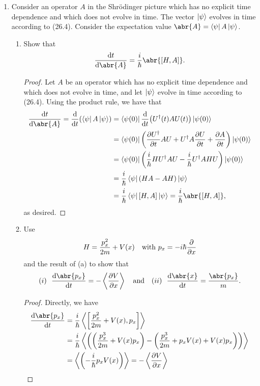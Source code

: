 \documentclass[11pt]{article}
\newcommand{\br}[1]{\left(#1\right)}
\newcommand{\sbr}[1]{\left[#1\right]}
\begin{document}
\begin{enumerate}[label=26.\arabic*]
    \item Consider an operator $A$ in the Shr\"odinger picture which has no explicit time dependence and which does not evolve in time. The vector $\ket{\psi}$ evolves in time according to (26.4). Consider the expectation value $\abr{A} = \bra{\psi}A\ket{\psi}$.
    \begin{enumerate}[label=(\alph*)]
        \item Show that \[\dv{t}\abr{A} = \frac{i}{\hbar}\abr{[H,A]}.\]
        \begin{proof}
            Let $A$ be an operator which has no explicit time dependence and which does not evolve in time, and let $\ket{\psi}$ evolve in time according to (26.4).
            Using the product rule, we have that \begin{align*}
                \dv{t}\abr{A} = \dv{t}(\bra{\psi}A\ket{\psi}) &= \bra{\psi(0)}\dv{t}(U^{\dagger}(t)AU(t))\ket{\psi(0)}\\
                &= \bra{\psi(0)}\br{\pdv{U^{\dagger}}{t}AU + U^{\dagger}A\pdv{U}{t} + \pdv{A}{t}}\ket{\psi(0)}\\
                &= \bra{\psi(0)}\br{\frac{i}{\hbar}HU^{\dagger}AU - \frac{i}{\hbar}U^{\dagger}AHU}\ket{\psi(0)}\\
                &= \frac{i}{\hbar}\bra{\psi}\br{HA-AH}\ket{\psi}\\
                &= \frac{i}{\hbar}\bra{\psi}\sbr{H,A}\ket{\psi} = \frac{i}{\hbar}\abr{[H,A]},
            \end{align*} as desired.
        \end{proof}
        \item Use \[H = \frac{p_x^2}{2m}+ V(x) \quad \text{with $p_x = -i\hbar\pdv{x}$}\] and the result of (a) to show that \[(i)~~ \dv{\abr{p_x}}{t} = -\left\langle\pdv{V}{x}\right\rangle\quad \text{and} \quad (ii)~~ \dv{\abr{x}}{t} = \frac{\abr{p_x}}{m}.\]
        \begin{proof}
            Directly, we have \begin{align*}
                \dv{\abr{p_x}}{t} &= \frac{i}{\hbar}\left\langle\sbr{\frac{p_x^2}{2m}+ V(x),p_x}\right\rangle\\
                &= \frac{i}{\hbar}\left\langle\br{\br{\frac{p_x^3}{2m}+ V(x)p_x }- \br{\frac{p_x^3}{2m}+ p_xV(x) + V(x)p_x} }\right\rangle\\
                &= \left\langle\br{-\frac{i}{\hbar}p_xV(x)}\right\rangle = -\left\langle\pdv{V}{x}\right\rangle\\

\end{align*}
\end{proof}
\end{enumerate}
\end{enumerate}
\end{document}
